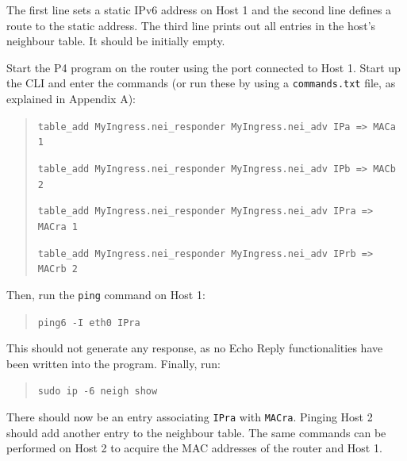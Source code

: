 The first line sets a static IPv6 address on Host 1 and the second line defines a route to the static address. The third line prints out all entries in the host’s neighbour table. It should be initially empty.

Start the P4 program on the router using the port connected to Host 1. Start up the CLI and enter the commands (or run these by using a \texttt{commands.txt} file, as explained in Appendix A):
\begin{quote}
    \texttt{table\_add MyIngress.nei\_responder MyIngress.nei\_adv IPa => MACa 1}
    
    \texttt{table\_add MyIngress.nei\_responder MyIngress.nei\_adv IPb => MACb 2}
    
    \texttt{table\_add MyIngress.nei\_responder MyIngress.nei\_adv IPra => MACra 1}
    
    \texttt{table\_add MyIngress.nei\_responder MyIngress.nei\_adv IPrb => MACrb 2}
\end{quote}

Then, run the \texttt{ping} command on Host 1:
\begin{quote}
    \texttt{ping6 -I eth0 IPra}
\end{quote}
This should not generate any response, as no Echo Reply functionalities have been written into the program. Finally, run:
\begin{quote}
    \texttt{sudo ip -6 neigh show}
\end{quote}

There should now be an entry associating \texttt{IPra} with \texttt{MACra}. Pinging Host 2 should add another entry to the neighbour table. The same commands can be performed on Host 2 to acquire the MAC addresses of the router and Host 1.
